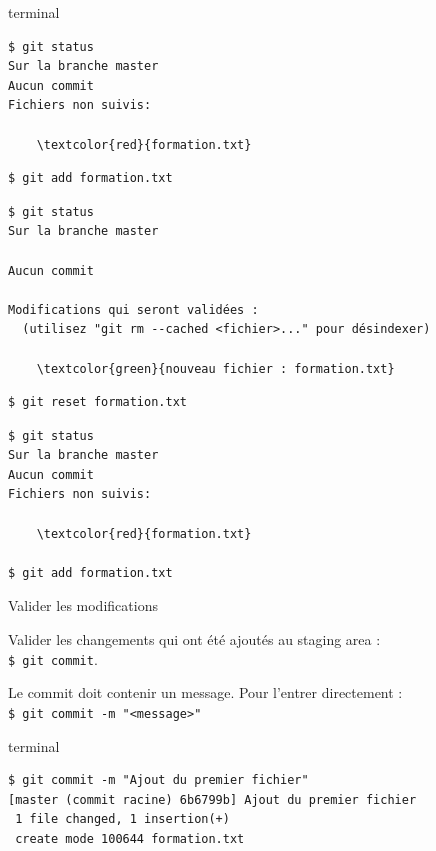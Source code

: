 \documentclass[usepdftitle=false]{beamer}
\def\seplength{.5\topsep}
\newcommand{\Pause}{%
\ifdef{\Release}
  {\pause}
  {}
}
\begin{document}
\begin{frame}[fragile]
\begin{beamercolorbox}[rounded=true,shadow=true]{terminal}
\vspace{-\seplength}
\begin{Verbatim}
$ git status
Sur la branche master
Aucun commit
Fichiers non suivis:

	\textcolor{red}{formation.txt}
\end{Verbatim}
\Pause
\vspace{-\seplength}
\begin{Verbatim}
$ git add formation.txt
\end{Verbatim}
\Pause
\vspace{-\seplength}
\begin{Verbatim}
$ git status
Sur la branche master

Aucun commit

Modifications qui seront validées :
  (utilisez "git rm --cached <fichier>..." pour désindexer)

	\textcolor{green}{nouveau fichier : formation.txt}
\end{Verbatim}
\Pause
\vspace{-\seplength}
\begin{Verbatim}
$ git reset formation.txt
\end{Verbatim}
\Pause
\vspace{-\seplength}
\begin{Verbatim}
$ git status
Sur la branche master
Aucun commit
Fichiers non suivis:

	\textcolor{red}{formation.txt}

$ git add formation.txt
\end{Verbatim}
\end{beamercolorbox}
\end{frame}

\begin{frame}[fragile]{Valider les modifications}

Valider les changements qui ont été ajoutés au staging area :\\
\verb+$ git commit+.

\medskip

Le commit doit contenir un message. Pour l'entrer directement : \\
\verb+$ git commit -m "<message>"+ \\

\bigskip

\begin{beamercolorbox}[rounded=true,shadow=true]{terminal}
\vspace{-\seplength}
\begin{Verbatim}
$ git commit -m "Ajout du premier fichier"
[master (commit racine) 6b6799b] Ajout du premier fichier
 1 file changed, 1 insertion(+)
 create mode 100644 formation.txt
\end{Verbatim}
\end{beamercolorbox}


\end{frame}
\end{document}
